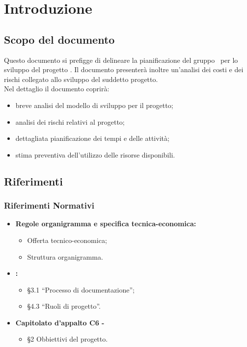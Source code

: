 \documentclass[PianoDiProgetto.tex]{subfiles}
\begin{document}
\chapter{Introduzione}

\section{Scopo del documento}
Questo documento si prefigge di delineare la pianificazione del gruppo \gruppo\ per lo sviluppo del progetto \progetto. Il documento presenterà inoltre un'analisi dei costi e dei rischi collegato allo sviluppo del suddetto progetto.\\
Nel dettaglio il documento coprirà:
\begin{itemize}
	\item breve analisi del modello di sviluppo per il progetto;
	\item analisi dei rischi relativi al progetto;
	\item dettagliata pianificazione dei tempi e delle attività;
	\item stima preventiva dell'utilizzo delle risorse disponibili.
\end{itemize}

\scopoProdotto

\glossExpl

\section{Riferimenti}
\subsection{Riferimenti Normativi}
\begin{itemize}
	\item \textbf{Regole organigramma e specifica tecnica-economica:} \\
		  \begin{itemize}
		  	\item Offerta tecnico-economica;
		  	\item Struttura organigramma.
		  \end{itemize}
	\item \textbf{\ndp \vruno:}
	 \begin{itemize}
	 	\item \S3.1 ``Processo di documentazione'';
	  	\item \S4.3 ``Ruoli di progetto''.
	 \end{itemize}
 	\item \textbf{Capitolato d'appalto C6 - \progetto}\\
 		\begin{itemize}
 			\item \S2 Obbiettivi del progetto.
 		\end{itemize}
	
\end{itemize}
\end{document}

